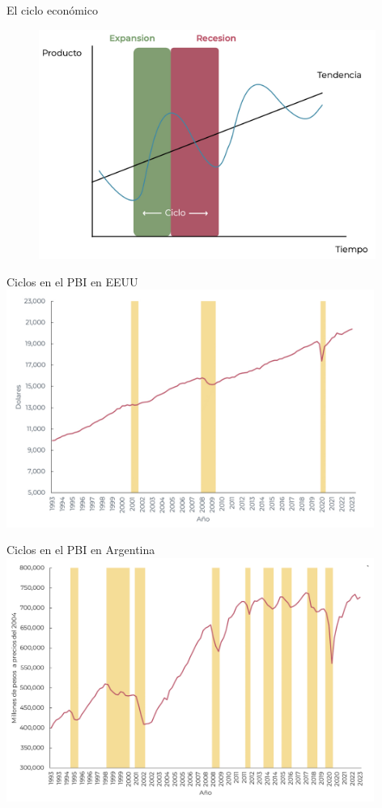 \documentclass{beamer}
\begin{document}
\begin{frame}{El ciclo económico}
    \begin{figure} [H]   
        \includegraphics[width=11cm]{../Figures/M19.1.jpg}
    \end{figure}
\end{frame}

\begin{frame}{Ciclos en el PBI en EEUU}
\centering\includegraphics[width=12cm]{../Figures/M19.2.jpg}
\end{frame}

\begin{frame}{Ciclos en el PBI en Argentina}
\centering\includegraphics[width=12cm]{../Figures/M19.3.jpg}
\end{frame}
\end{document}
